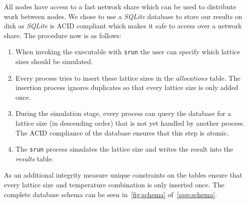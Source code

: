 All nodes have access to a fast network share which can be used to distribute work between nodes. We chose to use a \emph{SQLite} database to store our results on disk as \emph{SQLite} is ACID compliant which makes it safe to access over a network share. The procedure now is as follows:
\begin{enumerate}
	\item When invoking the executable with \texttt{srun} the user can specify which lattice sizes should be simulated.
	\item Every process tries to insert these lattice sizes in the \textit{allocations} table. The insertion process ignores duplicates so that every lattice size is only added once.
	\item During the simulation stage, every process can query the database for a lattice size (in descending order) that is not yet handled by another process. The ACID compliance of the database ensures that this step is atomic.
	\item The \texttt{srun} process simulates the lattice size and writes the result into the \textit{results} table.
\end{enumerate}
As an additional integrity measure unique constraints on the tables ensure that every lattice size and temperature combination is only inserted once. The complete database schema can be seen in~\cref{fig:schema} of~\cref{app:schema}.

